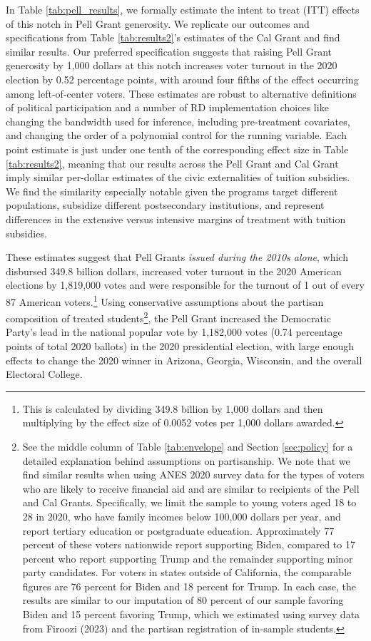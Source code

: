 \documentclass[12pt,letterpaper,oneside]{book}
\begin{document}
In Table \ref{tab:pell_results}, we formally estimate the intent to treat (ITT) effects of this notch in Pell Grant generosity. We replicate our outcomes and specifications from Table \ref{tab:results2}'s estimates of the Cal Grant and find similar results. Our preferred specification suggests that raising Pell Grant generosity by 1,000 dollars at this notch increases voter turnout in the 2020 election by 0.52 percentage points, with around four fifths of the effect occurring among left-of-center voters. These estimates are robust to alternative definitions of political participation and a number of RD implementation choices like changing the bandwidth used for inference, including pre-treatment covariates, and changing the order of a polynomial control for the running variable. Each point estimate is just under one tenth of the corresponding effect size in Table \ref{tab:results2}, meaning that our results across the Pell Grant and Cal Grant imply similar per-dollar estimates of the civic externalities of tuition subsidies. We find the similarity especially notable given the programs target different populations, subsidize different postsecondary institutions, and represent differences in the extensive versus intensive margins of treatment with tuition subsidies.

These estimates suggest that Pell Grants \textit{issued during the 2010s alone}, which disbursed 349.8 billion dollars, increased voter turnout in the 2020 American elections by 1,819,000 votes and were responsible for the turnout of 1 out of every 87 American voters.\footnote{This is calculated by dividing 349.8 billion by 1,000 dollars and then multiplying by the effect size of 0.0052 votes per 1,000 dollars awarded.} Using conservative assumptions about the partisan composition of treated students\footnote{See the middle column of Table \ref{tab:envelope} and Section \ref{sec:policy} for a detailed explanation behind assumptions on partisanship. We note that we find similar results when using ANES 2020 survey data for the types of voters who are likely to receive financial aid and are similar to recipients of the Pell and Cal Grants. Specifically, we limit the sample to young voters aged 18 to 28 in 2020, who have family incomes below 100,000 dollars per year, and report tertiary education or postgraduate education. Approximately 77 percent of these voters nationwide report supporting Biden, compared to 17 percent who report supporting Trump and the remainder supporting minor party candidates. For voters in states outside of California, the comparable figures are 76 percent for Biden and 18 percent for Trump. In each case, the results are similar to our imputation of 80 percent of our sample favoring Biden and 15 percent favoring Trump, which we estimated using survey data from Firoozi (2023) and the partisan registration of in-sample students.}, the Pell Grant increased the Democratic Party's lead in the national popular vote by 1,182,000 votes (0.74 percentage points of total 2020 ballots) in the 2020 presidential election, with large enough effects to change the 2020 winner in Arizona, Georgia, Wisconsin, and the overall Electoral College.
\clearpage
\end{document}
